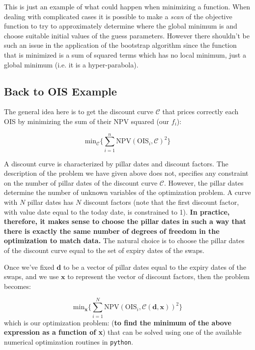 This is just an example of what could happen when minimizing a function.
When dealing with complicated cases it is possible to make a \emph{scan} of the objective 
function to try to approximately determine where the global minimum is and choose 
suitable initial values of the guess parameters.
However there shouldn't be such an issue in the application of the bootstrap algorithm since the function that is minimized is a sum of squared terms which has no local minimum, just a global minimum (i.e. it is a hyper-parabola).

\subsection{Back to OIS Example}\label{ois-example}
The general idea here is to get the discount curve \(\mathcal{C}\) that prices correctly 
each OIS by minimizing the sum of their NPV squared (our \(f_i\)):

\begin{equation}
\mathrm{min}_{\mathcal{C}} \Big\{\sum_{i=1}^{n}\mathrm{NPV}(\mathrm{OIS}_i, \mathcal{C})^2\Big\}
\end{equation}

A discount curve is characterized by pillar dates and discount factors. The description of the problem we have given above does not, specifies any constraint on the number of pillar dates of 
the discount curve \(\mathcal{C}\). However, the pillar dates determine the number of unknown variables of the optimization problem. A curve with \(N\) pillar dates has \(N\) discount factors (note that the first discount factor, with value date equal to the today date, is constrained to 1). \textbf{In practice, therefore, it makes sense to choose the pillar dates in such a way that 
	there is exactly the same number of degrees of freedom in the optimization to match data.} 
The natural choice is to choose the pillar dates of the discount curve equal to the set of expiry dates of the swaps.

Once we've fixed \(\mathbf{d}\) to be a vector of pillar dates equal to the expiry dates of the swaps, and we use \(\mathbf{x}\) to represent the vector of discount factors, then the problem becomes:

\begin{equation}
\mathrm{min}_{\mathbf{x}} \Big\{\sum_{i=1}^{N}\mathrm{NPV}(\mathrm{OIS}_i, \mathcal{C}(\mathbf{d}, \mathbf{x}))^2\Big\}
\end{equation}
which is our optimization problem: (\textbf{to find the minimum of the above expression as a function of x}) that can be solved using one of the available numerical optimization routines 
in \texttt{python}.


